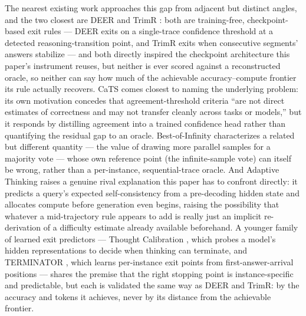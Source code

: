 \documentclass[11pt]{article}
\begin{document}
The nearest existing work approaches this gap from adjacent but distinct angles, and the two closest are DEER \citep{DEER2607} and TrimR \citep{TrimR2607}: both are training-free, checkpoint-based exit rules --- DEER exits on a single-trace confidence threshold at a detected reasoning-transition point, and TrimR exits when consecutive segments' answers stabilize --- and both directly inspired the checkpoint architecture this paper's instrument reuses, but neither is ever scored against a reconstructed oracle, so neither can say how much of the achievable accuracy--compute frontier its rule actually recovers. CaTS \citep{CaTS2607} comes closest to naming the underlying problem: its own motivation concedes that agreement-threshold criteria ``are not direct estimates of correctness and may not transfer cleanly across tasks or models,'' but it responds by distilling agreement into a trained confidence head rather than quantifying the residual gap to an oracle. Best-of-Infinity \citep{BestOfInfinity2607} characterizes a related but different quantity --- the value of drawing more parallel samples for a majority vote --- whose own reference point (the infinite-sample vote) can itself be wrong, rather than a per-instance, sequential-trace oracle. And Adaptive Thinking \citep{AdaptiveThinking2607} raises a genuine rival explanation this paper has to confront directly: it predicts a query's expected self-consistency from a pre-decoding hidden state and allocates compute before generation even begins, raising the possibility that whatever a mid-trajectory rule appears to add is really just an implicit re-derivation of a difficulty estimate already available beforehand. A younger family of learned exit predictors --- Thought Calibration \citep{ThoughtCalib2505}, which probes a model's hidden representations to decide when thinking can terminate, and TERMINATOR \citep{TERMINATOR2603}, which learns per-instance exit points from first-answer-arrival positions --- shares the premise that the right stopping point is instance-specific and predictable, but each is validated the same way as DEER and TrimR: by the accuracy and tokens it achieves, never by its distance from the achievable frontier.
\end{document}
